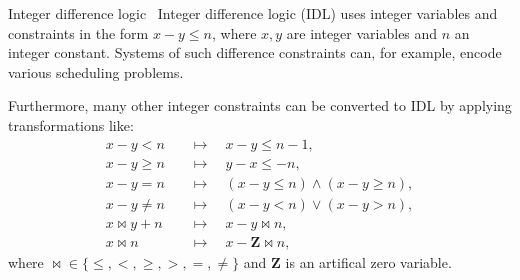 \documentclass{beamer}
\begin{document}
\begin{frame}[fragile,t]
\begin{columns}[t,onlytextwidth]
\begin{column}{0.485\textwidth}
		\begin{block}{Integer difference logic~\cite{slides}}
			Integer difference logic (IDL) uses integer variables and constraints in the form $x - y \leq n$, where $x, y$ are integer variables and $n$ an integer constant. Systems of such difference constraints can, for example, encode various scheduling problems.
			
			Furthermore, many other integer constraints can be converted to IDL by applying transformations like:
			\begin{align*}
				x - y < n \quad&\mapsto\quad x - y \leq n - 1, \\
				x - y \geq n \quad&\mapsto\quad y - x \leq -n, \\
				x - y = n \quad&\mapsto\quad (x - y \leq n) \land (x - y \geq n), \\
				x - y \neq n \quad&\mapsto\quad (x - y < n) \lor (x - y > n), \\
				x \bowtie y + n \quad&\mapsto\quad x - y \bowtie n, \\
				x \bowtie n \quad&\mapsto\quad x - \mathbf{Z} \bowtie n,
			\end{align*}
			where ${\bowtie} \in \{\leq, <, \geq, >, =, \neq\}$ and $\mathbf{Z}$ is an artifical zero variable.
		\end{block}


\end{column}
\end{columns}
\end{frame}
\end{document}
